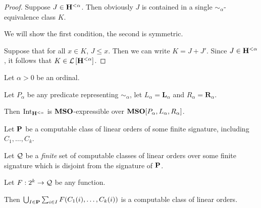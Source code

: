 \begin{proof}
  Suppose $J \in \mathbf{H}_{}^{< \alpha}$.
  Then obviously $J$ is contained in a single $\sim_{\alpha}$-equivalence class $K$.

  We will show the first condition, the second is symmetric.

  Suppose that for all $x \in K$, $J \le x$.
  Then we can write $K = J + J'$.
  Since $J \in \mathbf{H}_{}^{< \alpha}$, it follows that $K \in \mathcal{L} \left[ {{\mathbf{H}_{}^{< \alpha}}} \right]$.
\end{proof}

\begin{corollary}\label{int-expressible}
  Let $\alpha > 0$ be an ordinal.

  Let $P_{\alpha}$ be any predicate representing $\sim_{\alpha}$,
  let $L_{\alpha} = \mathbf{L}_{\alpha}$ and $R_{\alpha} = \mathbf{R}_{\alpha}$.

  Then $\mathrm{Int}_{\mathbf{H}_{}^{< \alpha}}$ is $\mathbf{MSO}$-expressible over
  $\mathbf{MSO}[P_{\alpha}, L_{\alpha}, R_{\alpha}]$.
\end{corollary}

\begin{theorem}\label{computable-sum}
  Let $\mathbf{P}$ be a computable class of linear orders of some finite signature,
  including $C_1, \ldots, C_k$.

  Let $\mathcal{Q}$ be a \emph{finite} set of computable classes of linear orders
  over some finite signature which is disjoint from the signature of $\mathbf{P}$.

  Let $F : 2^k \to \mathcal{Q}$ be any function.

  Then $\bigcup_{I \in \mathbf{P}} \sum_{i \in I} F(C_1(i), \ldots, C_k(i))$ is a computable class of linear orders.
\end{theorem}

